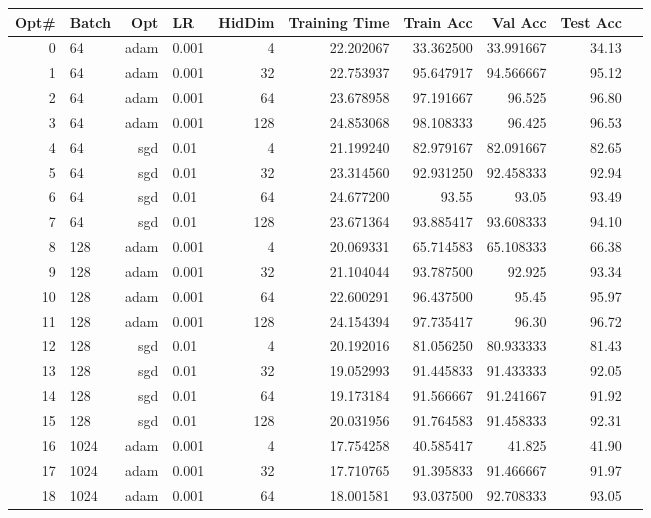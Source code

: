 \begin{solve}
\begin{enumerate}
\begin{table}[H]
    \centering
\begin{tabular}{rlrlrrrrrr}
    Opt\# & Batch & Opt & LR & HidDim& Training Time & Train Acc & Val Acc & Test Acc\\
    \midrule
    \rowcolor{red!50}
    0 & 64 & adam & 0.001 & 4 & 22.202067 & 33.362500 & 33.991667 & 34.13 \\
    1 & 64 & adam & 0.001 & 32 & 22.753937 & 95.647917 & 94.566667 & 95.12 \\
    \rowcolor{yellow!50}
    2 & 64 & adam & 0.001 & 64 & 23.678958 & 97.191667 & 96.525 & 96.80 \\
    3 & 64 & adam & 0.001 & 128 & 24.853068 & 98.108333 & 96.425 & 96.53 \\
    4 & 64 & sgd & 0.01 & 4 & 21.199240 & 82.979167 & 82.091667 & 82.65 \\
    5 & 64 & sgd & 0.01 & 32 & 23.314560 & 92.931250 & 92.458333 & 92.94 \\
    6 & 64 & sgd & 0.01 & 64 & 24.677200 & 93.55 & 93.05 & 93.49 \\
    \rowcolor{orange!50}
    7 & 64 & sgd & 0.01 & 128 & 23.671364 & 93.885417 & 93.608333 & 94.10 \\
    8 & 128 & adam & 0.001 & 4 & 20.069331 & 65.714583 & 65.108333 & 66.38 \\
    9 & 128 & adam & 0.001 & 32 & 21.104044 & 93.787500 & 92.925 & 93.34 \\
    10 & 128 & adam & 0.001 & 64 & 22.600291 & 96.437500 & 95.45 & 95.97 \\
    \rowcolor{yellow!50}
    11 & 128 & adam & 0.001 & 128 & 24.154394 & 97.735417 & 96.30 & 96.72 \\
    12 & 128 & sgd & 0.01 & 4 & 20.192016 & 81.056250 & 80.933333 & 81.43 \\
    13 & 128 & sgd & 0.01 & 32 & 19.052993 & 91.445833 & 91.433333 & 92.05 \\
    14 & 128 & sgd & 0.01 & 64 & 19.173184 & 91.566667 & 91.241667 & 91.92 \\
    15 & 128 & sgd & 0.01 & 128 & 20.031956 & 91.764583 & 91.458333 & 92.31 \\
    \rowcolor{red!50}
    16 & 1024 & adam & 0.001 & 4 & 17.754258 & 40.585417 & 41.825 & 41.90 \\
    17 & 1024 & adam & 0.001 & 32 & 17.710765 & 91.395833 & 91.466667 & 91.97 \\
    18 & 1024 & adam & 0.001 & 64 & 18.001581 & 93.037500 & 92.708333 & 93.05 \\

\end{tabular}
\end{table}
\end{enumerate}
\end{solve}
